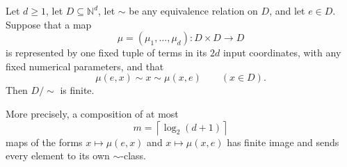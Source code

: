 \begin{theorem}
\label{obs:quotient-unit}
Let $d\ge1$, let $D\subseteq\mathbb N^d$, let $\sim$ be any equivalence
relation on $D$, and let $e\in D$. Suppose that a map
\[
 \mu=(\mu_1,\ldots,\mu_d):D\times D\longrightarrow D
\]
is represented by one fixed tuple of terms in its $2d$ input coordinates,
with any fixed numerical parameters, and that
\[
             \mu(e,x)\sim x\sim\mu(x,e)
             \qquad(x\in D).
             \tag{Unit}\label{obs:unit}
\]
Then $D/{\sim}$ is finite.

More precisely, a composition of at most
\[
                  m=\left\lceil\log_2(d+1)\right\rceil
\]
maps of the forms $x\mapsto\mu(e,x)$ and $x\mapsto\mu(x,e)$ has finite
image and sends every element to its own $\sim$-class.
\end{theorem}

